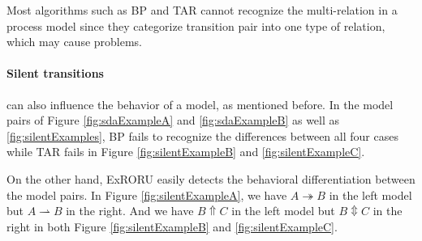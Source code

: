 \documentclass[dvips,...]{llncs}
\begin{document}
Most algorithms such as BP and TAR cannot recognize the multi-relation in a process model since they categorize transition pair into one type of relation, which may cause problems.

\paragraph{Silent transitions} can also influence the behavior of a model, as mentioned before. In the model pairs of Figure \ref{fig:sdaExampleA} and \ref{fig:sdaExampleB} as well as \ref{fig:silentExamples}, BP fails to recognize the differences between all four cases while TAR fails in Figure \ref{fig:silentExampleB} and \ref{fig:silentExampleC}. 

On the other hand, ExRORU easily detects the behavioral differentiation between the model pairs. In Figure \ref{fig:silentExampleA}, we have $A\twoheadrightarrow B$ in the left model but $A\rightharpoonup B$ in the right. And we have $B\Uparrow C$ in the left model but $B\Updownarrow C$ in the right in both Figure \ref{fig:silentExampleB} and \ref{fig:silentExampleC}.
\end{document}
